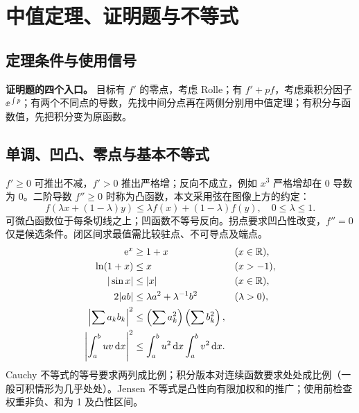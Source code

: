 \chapter{中值定理、证明题与不等式}
\section{定理条件与使用信号}

\textbf{证明题的四个入口。}
目标有 $f'$ 的零点，考虑 Rolle；有 $f'+pf$，考虑乘积分因子 $\ee^{\int p}$；有两个不同点的导数，先找中间分点再在两侧分别用中值定理；有积分与函数值，先把积分变为原函数。

\section{单调、凹凸、零点与基本不等式}
$f'\ge0$ 可推出不减，$f'>0$ 推出严格增；反向不成立，例如 $x^3$ 严格增却在 0 导数为 0。二阶导数 $f''\ge0$ 时称为凸函数，本文采用弦在图像上方的约定：
\[
f(\lambda x+(1-\lambda)y)\le\lambda f(x)+(1-\lambda)f(y),\quad0\le\lambda\le1.
\]
可微凸函数位于每条切线之上；凹函数不等号反向。拐点要求凹凸性改变，$f''=0$ 仅是候选条件。闭区间求最值需比较驻点、不可导点及端点。
\begin{align*}
\mathrm e^x&\ge1+x &&(x\in\mathbb R),\\
\ln(1+x)&\le x &&(x>-1),\\
|\sin x|&\le |x| &&(x\in\mathbb R),\\
2|ab|&\le \lambda a^2+\lambda^{-1}b^2 &&(\lambda>0),\\
\left|\sum a_kb_k\right|^2&\le\left(\sum a_k^2\right)\left(\sum b_k^2\right),\\
\left|\int_a^b uv\,\mathrm d x\right|^2&\le\int_a^b u^2\,\mathrm d x\int_a^b v^2\,\mathrm d x.
\end{align*}
Cauchy 不等式的等号要求两列成比例；积分版本对连续函数要求处处成比例（一般可积情形为几乎处处）。Jensen 不等式是凸性向有限加权和的推广；使用前检查权重非负、和为 1 及凸性区间。

